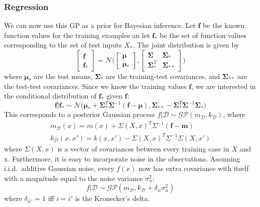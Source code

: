 \documentclass{article}
\begin{document}
\subsubsection{Regression}
We can now use this GP as a prior for Bayesian inference. Let $\mathbf{f}$ be the known function values for the training examples an let $\mathbf{f}_*$ be the set of function values corresponding to the set of test inputs $X_*$. The joint distribution is given by
\begin{equation*}
\begin{bmatrix} \mathbf{f} \\ \mathbf{f}_* \end{bmatrix} 
= 
\mathcal{N}\Big(\begin{bmatrix} \bm{\mu} \\ \bm{\mu}_* \end{bmatrix}, \begin{bmatrix}\bm{\Sigma} & \bm{\Sigma}_* \\ \bm{\Sigma}_*^T & \bm{\Sigma}_{**} \end{bmatrix} \Big)
\end{equation*}
where $\bm{\mu}_*$ are the test means, $\bm{\Sigma}_*$ are the training-test covariances, and $\bm{\Sigma}_{**}$ are the test-test covariances. Since we know the training values $\mathbf{f}$, we are interested in the conditional distribution of $\mathbf{f}_*$ given $\mathbf{f}$:
\begin{equation*}
	\mathbf{f} \big\vert \mathbf{f}_* \sim
	\mathcal{N} \big( \bm{\mu}_* + \mathbf{\Sigma}_*^T \mathbf{\Sigma}^{-1}(\mathbf{f}-\bm{\mu}), \mathbf{\Sigma}_{**} - \mathbf{\Sigma}^T_*\mathbf{\Sigma}^{-1}\mathbf{\Sigma}_* \big)
\end{equation*}
This corresponds to a posterior Gaussian process $f \big\vert \mathcal{D} \sim \mathcal{GP}(m_\mathcal{D}, k_\mathcal{D})$, where
\begin{align*}
	 m_\mathcal{D}(x) = m(x) + \Sigma(X,x)^T\Sigma^{-1}(\mathbf{f}-\mathbf{m})\\
	k_\mathcal{D}(x, x') = k(x, x') - \Sigma(X,x)^T\Sigma^{-1}\Sigma(X, x')
\end{align*}
where $\Sigma(X, x)$ is a vector of covariances between every training case in $X$ and x. Furthermore, it is easy to incorporate noise in the observations. Assuming i.i.d.\ additive Gaussian noise, every $f(x)$ now has extra covariance with itself with a magnitude equal to the noise variance $\sigma_n^2$:
\begin{equation*}
	f \big\vert \mathcal{D} \sim \mathcal{GP}(m_\mathcal{D}, k_\mathcal{D} + \delta_{ii} \sigma_n^2)
\end{equation*}
where $\delta_{ii'} = 1$ iff $i=i'$ is the Kronecker's delta.
\end{document}
